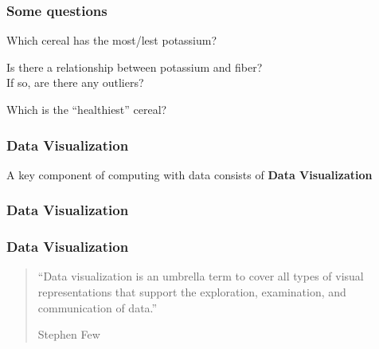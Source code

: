 \documentclass[12pt]{beamer}\usepackage[]{graphicx}\usepackage[]{color}
\begin{document}

\begin{frame}
\frametitle{Some questions}

\bbi
  \item Which cereal has the most/lest potassium?
  \item Is there a relationship between potassium and fiber? \\
  If so, are there any outliers?
  \item Which is the ``healthiest'' cereal?
\ei

\end{frame}


\begin{frame}
\frametitle{Data Visualization}

A key component of computing with data consists of \textbf{Data Visualization}

\end{frame}


\begin{frame}[fragile]
\begin{center}
\end{center}
\end{frame}


\begin{frame}
\frametitle{Data Visualization}
\begin{center}
\end{center}
\end{frame}


\begin{frame}
\frametitle{Data Visualization}

\begin{quotation}
\noindent
``Data visualization is an umbrella term to cover all types of visual 
representations that support the exploration, examination, and communication
of data.''

Stephen Few

\end{quotation}

\end{frame}
\end{document}

